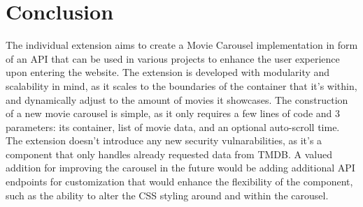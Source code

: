 \documentclass[letterpaper,twocolumn]{article}
\begin{document}
\section{Conclusion}
The individual extension aims to create a Movie Carousel implementation in form of an API that can be used in various projects to enhance the user experience upon entering the website. 
The extension is developed with modularity and scalability in mind, as it scales to the boundaries of the container that it's within, and dynamically adjust to the amount of movies it showcases. 
The construction of a new movie carousel is simple, as it only requires a few lines of code and 3 parameters: its container, list of movie data, and an optional auto-scroll time.
The extension doesn't introduce any new security vulnarabilities, as it's a component that only handles already requested data from TMDB.
A valued addition for improving the carousel in the future would be adding additional API endpoints for customization that would enhance the flexibility of the component, such as the ability to alter the CSS styling around and within the carousel.
\end{document}
